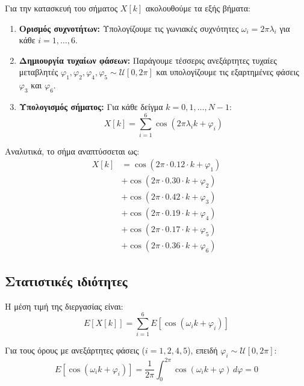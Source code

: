 \documentclass[a4paper,12pt]{article}
\begin{document}
Για την κατασκευή του σήματος $X[k]$ ακολουθούμε τα εξής βήματα:

\begin{enumerate}
    \item \textbf{Ορισμός συχνοτήτων:} Υπολογίζουμε τις γωνιακές συχνότητες $\omega_i = 2\pi\lambda_i$ για κάθε $i = 1, \dots, 6$.

    \item \textbf{Δημιουργία τυχαίων φάσεων:} Παράγουμε τέσσερις ανεξάρτητες τυχαίες μεταβλητές $\varphi_1, \varphi_2, \varphi_4, \varphi_5 \sim \mathcal{U}[0, 2\pi]$ και υπολογίζουμε τις εξαρτημένες φάσεις $\varphi_3$ και $\varphi_6$.

    \item \textbf{Υπολογισμός σήματος:} Για κάθε δείγμα $k = 0, 1, \dots, N-1$:
    \begin{equation}
        X[k] = \sum_{i=1}^{6} \cos(2\pi\lambda_i k + \varphi_i)
    \end{equation}
\end{enumerate}

Αναλυτικά, το σήμα αναπτύσσεται ως:
\begin{align}
    X[k] &= \cos(2\pi \cdot 0.12 \cdot k + \varphi_1) \nonumber \\
          &+ \cos(2\pi \cdot 0.30 \cdot k + \varphi_2) \nonumber \\
          &+ \cos(2\pi \cdot 0.42 \cdot k + \varphi_3) \nonumber \\
          &+ \cos(2\pi \cdot 0.19 \cdot k + \varphi_4) \nonumber \\
          &+ \cos(2\pi \cdot 0.17 \cdot k + \varphi_5) \nonumber \\
          &+ \cos(2\pi \cdot 0.36 \cdot k + \varphi_6)
    \label{eq:signal_expanded}
\end{align}

\subsection{Στατιστικές ιδιότητες}

Η μέση τιμή της διεργασίας είναι:
\begin{equation}
    E[X[k]] = \sum_{i=1}^{6} E[\cos(\omega_i k + \varphi_i)]
\end{equation}

Για τους όρους με ανεξάρτητες φάσεις ($i = 1, 2, 4, 5$), επειδή $\varphi_i \sim \mathcal{U}[0, 2\pi]$:
\begin{equation}
    E[\cos(\omega_i k + \varphi_i)] = \frac{1}{2\pi} \int_0^{2\pi} \cos(\omega_i k + \varphi) \, d\varphi = 0
\end{equation}
\end{document}
